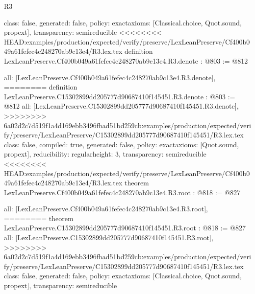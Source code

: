 \begin{lexlean}{R3}
\begin{coremodule}
{{{{{{{  class: false,
  generated: false,
  policy: exact{axioms: [Classical.choice, Quot.sound, propext]},
  transparency: semireducible
}
<<<<<<<< HEAD:examples/production/expected/verify/preserve/LexLeanPreserve/Cf400b049a61fefec4c248270ab9c13e4/R3.lex.tex
definition LexLeanPreserve.Cf400b049a61fefec4c248270ab9c13e4.R3.denote : @803 := @812 {
  all: [LexLeanPreserve.Cf400b049a61fefec4c248270ab9c13e4.R3.denote],
========
definition LexLeanPreserve.C15302899dd205777d90687410f145451.R3.denote : @803 := @812 {
  all: [LexLeanPreserve.C15302899dd205777d90687410f145451.R3.denote],
>>>>>>>> 6a02d2c7d519f1a4d169ebb3496fbad51bd259cb:examples/production/expected/verify/preserve/LexLeanPreserve/C15302899dd205777d90687410f145451/R3.lex.tex
  class: false,
  compiled: true,
  generated: false,
  policy: exact{axioms: [Quot.sound, propext]},
  reducibility: regular{height: 3},
  transparency: semireducible
}
<<<<<<<< HEAD:examples/production/expected/verify/preserve/LexLeanPreserve/Cf400b049a61fefec4c248270ab9c13e4/R3.lex.tex
theorem LexLeanPreserve.Cf400b049a61fefec4c248270ab9c13e4.R3.root : @818 := @827 {
  all: [LexLeanPreserve.Cf400b049a61fefec4c248270ab9c13e4.R3.root],
========
theorem LexLeanPreserve.C15302899dd205777d90687410f145451.R3.root : @818 := @827 {
  all: [LexLeanPreserve.C15302899dd205777d90687410f145451.R3.root],
>>>>>>>> 6a02d2c7d519f1a4d169ebb3496fbad51bd259cb:examples/production/expected/verify/preserve/LexLeanPreserve/C15302899dd205777d90687410f145451/R3.lex.tex
  class: false,
  generated: false,
  policy: exact{axioms: [Classical.choice, Quot.sound, propext]},
  transparency: semireducible
}

}}}}}}}}
\end{coremodule}
\end{lexlean}
